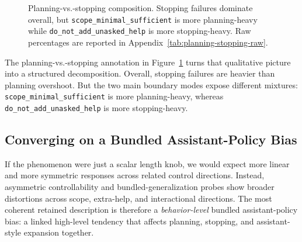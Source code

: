 \documentclass[11pt]{article}
\begin{document}
\begin{figure}[t]
\centering
{}
\caption{Planning-vs.-stopping composition. Stopping failures dominate overall, but \texttt{scope\_minimal\_sufficient} is more planning-heavy while \texttt{do\_not\_add\_unasked\_help} is more stopping-heavy. Raw percentages are reported in Appendix~\ref{tab:planning-stopping-raw}.}
\label{fig:planning-stopping}
\end{figure}

The planning-vs.-stopping annotation in Figure~\ref{fig:planning-stopping} turns that qualitative picture into a structured decomposition. Overall, stopping failures are heavier than planning overshoot. But the two main boundary modes expose different mixtures: \texttt{scope\_minimal\_sufficient} is more planning-heavy, whereas \texttt{do\_not\_add\_unasked\_help} is more stopping-heavy.

\subsection{Converging on a Bundled Assistant-Policy Bias}

If the phenomenon were just a scalar length knob, we would expect more linear and more symmetric responses across related control directions. Instead, asymmetric controllability and bundled-generalization probes show broader distortions across scope, extra-help, and interactional directions. The most coherent retained description is therefore a \emph{behavior-level} bundled assistant-policy bias: a linked high-level tendency that affects planning, stopping, and assistant-style expansion together.
\end{document}
